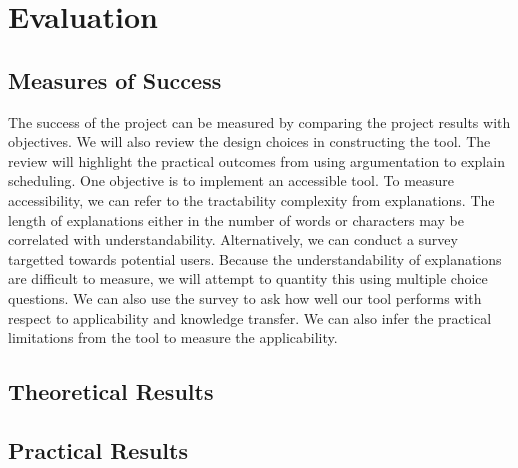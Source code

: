 \chapter{Evaluation}

\section{Measures of Success}

The success of the project can be measured by comparing the project results with objectives. We will also review the design choices in constructing the tool. The review will highlight the practical outcomes from using argumentation to explain scheduling.
\linespace
One objective is to implement an accessible tool. To measure accessibility, we can refer to the tractability complexity from explanations. The length of explanations either in the number of words or characters may be correlated with understandability. Alternatively, we can conduct a survey targetted towards potential users. Because the understandability of explanations are difficult to measure, we will attempt to quantity this using multiple choice questions.
\linespace
We can also use the survey to ask how well our tool performs with respect to applicability and knowledge transfer. We can also infer the practical limitations from the tool to measure the applicability.

\section{Theoretical Results}

\section{Practical Results} 